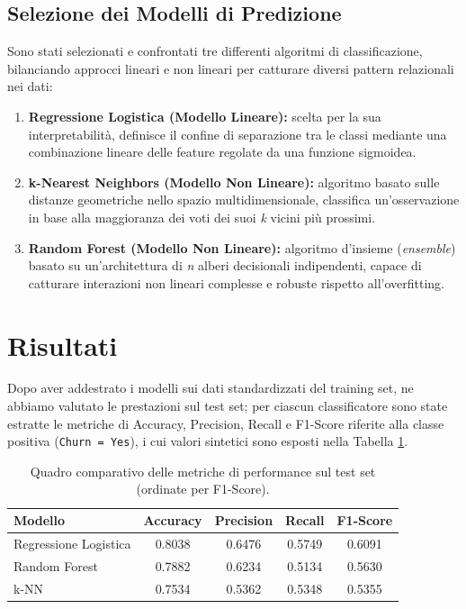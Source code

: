 \documentclass[11pt,a4paper]{article}
\begin{document}
\subsection{Selezione dei Modelli di Predizione}
Sono stati selezionati e confrontati tre differenti algoritmi di classificazione, bilanciando approcci lineari e non lineari per catturare diversi pattern relazionali nei dati:
\begin{enumerate}
    \item \textbf{Regressione Logistica (Modello Lineare):} scelta per la sua interpretabilità, definisce il confine di separazione tra le classi mediante una combinazione lineare delle feature regolate da una funzione sigmoidea.
    \item \textbf{k-Nearest Neighbors (Modello Non Lineare):} algoritmo basato sulle distanze geometriche nello spazio multidimensionale, classifica un'osservazione in base alla maggioranza dei voti dei suoi \textit{k} vicini più prossimi.
    \item \textbf{Random Forest (Modello Non Lineare):} algoritmo d'insieme (\textit{ensemble}) basato su un'architettura di \textit{n} alberi decisionali indipendenti, capace di catturare interazioni non lineari complesse e robuste rispetto all'overfitting.
\end{enumerate}


\section{Risultati}
Dopo aver addestrato i modelli sui dati standardizzati del training set, ne abbiamo valutato le prestazioni sul test set; per ciascun classificatore sono state estratte le metriche di Accuracy, Precision, Recall e F1-Score riferite alla classe positiva (\texttt{Churn = Yes}), i cui valori sintetici sono esposti nella Tabella \ref{tab:metriche}.


\begin{table}[htbp]
    \centering
    \caption{Quadro comparativo delle metriche di performance sul test set (ordinate per F1-Score).}
    \label{tab:metriche}
    \begin{tabular}{lcccc}
        \hline
        \textbf{Modello} & \textbf{Accuracy} & \textbf{Precision} & \textbf{Recall} & \textbf{F1-Score} \\ \hline
        Regressione Logistica & 0.8038 & 0.6476 & 0.5749 & 0.6091 \\ 
        Random Forest & 0.7882 & 0.6234 & 0.5134 & 0.5630 \\ 
        k-NN & 0.7534 & 0.5362 & 0.5348 & 0.5355 \\ \hline
    \end{tabular}
\end{table}
\end{document}
